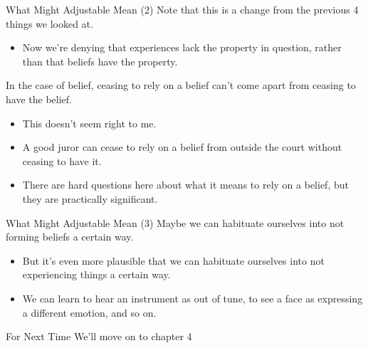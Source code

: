 \documentclass[
  17pt,
  letterpaper,
  ignorenonframetext,
  aspectratio=169,
  xcolor={dvipsnames}]{beamer}
\providecommand{\tightlist}{%
  \setlength{\itemsep}{0pt}\setlength{\parskip}{0pt}}\usepackage{longtable,booktabs,array}
\begin{document}
\begin{frame}{What Might Adjustable Mean (2)}
\protect\hypertarget{what-might-adjustable-mean-2-1}{}
Note that this is a change from the previous 4 things we looked at.

\begin{itemize}[<+->]
\tightlist
\item
  Now we're denying that experiences lack the property in question,
  rather than that beliefs have the property.
\end{itemize}

\end{frame} \begin{frame}[plain]

In the case of belief, ceasing to rely on a belief can't come apart from
ceasing to have the belief.

\begin{itemize}[<+->]
\tightlist
\item
  This doesn't seem right to me.
\item
  A good juror can cease to rely on a belief from outside the court
  without ceasing to have it.
\item
  There are hard questions here about what it means to rely on a belief,
  but they are practically significant.
\end{itemize}
\end{frame}

\begin{frame}{What Might Adjustable Mean (3)}
\protect\hypertarget{what-might-adjustable-mean-3}{}
Maybe we can habituate ourselves into not forming beliefs a certain way.

\begin{itemize}[<+->]
\tightlist
\item
  But it's even more plausible that we can habituate ourselves into not
  experiencing things a certain way.
\item
  We can learn to hear an instrument as out of tune, to see a face as
  expressing a different emotion, and so on.
\end{itemize}
\end{frame}

\begin{frame}{For Next Time}
\protect\hypertarget{for-next-time}{}
We'll move on to chapter 4
\end{frame}
\end{document}
